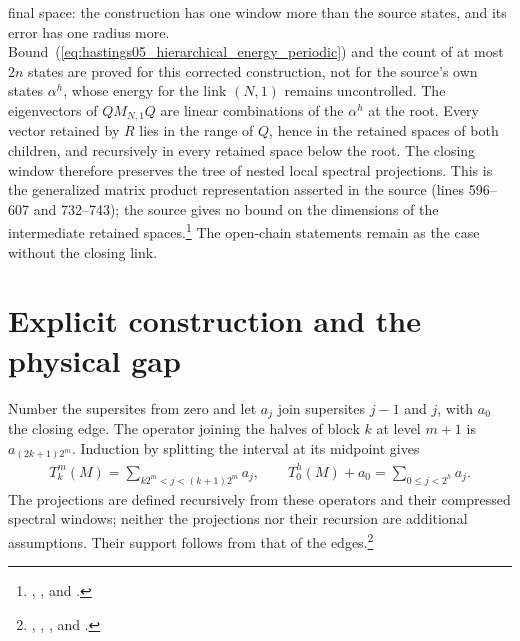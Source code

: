 \documentclass{article}
\begin{document}
final space: the construction has one window more than the source states,
and its error has one radius more. Bound~(\ref{eq:hastings05_hierarchical_energy_periodic})
and the count of at most $2n$ states are proved for this corrected
construction, not for the source's own states $\alpha^h$, whose energy for the
link $(N,1)$ remains uncontrolled. The eigenvectors of $QM_{N,1}Q$ are linear
combinations of the $\alpha^h$ at the root. Every vector retained by $R$ lies
in the range of $Q$, hence in the retained spaces of both children, and
recursively in every retained space below the root. The closing window
therefore preserves the tree of nested local spectral projections. This is
the generalized matrix product representation asserted in the source
(lines 596--607 and 732--743); the source gives no bound on the dimensions
of the intermediate retained spaces.\footnote{,
, and
.}
The open-chain statements remain as the case without the closing link.
\section{Explicit construction and the physical gap}
Number the supersites from zero and let $a_j$ join supersites $j-1$ and $j$,
with $a_0$ the closing edge. The operator joining the halves of block $k$
at level $m+1$ is $a_{(2k+1)2^m}$. Induction by splitting the interval at its
midpoint gives
\begin{align}
 T_k^m(M)=\sum_{k2^m<j<(k+1)2^m}a_j,
 \qquad T_0^h(M)+a_0=\sum_{0\le j<2^h}a_j.
 \label{eq:hastings05_tree_edges}
\end{align}
The projections are defined recursively from these operators and their
compressed spectral windows; neither the projections nor their recursion
are additional assumptions. Their support follows from that of the
edges.\footnote{,
,
, and
.}
\end{document}
